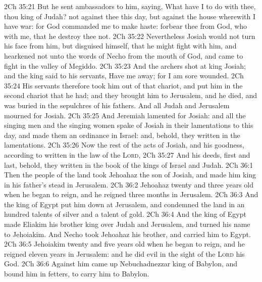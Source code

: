 \vs 2Ch 35:21 But he sent ambassadors to him, saying, What have I to do with thee, thou king of Judah?  not against thee this day, but against the house wherewith I have war: for God commanded me to make haste: forbear thee from  God, who  with me, that he destroy thee not.
\vs 2Ch 35:22 Nevertheless Josiah would not turn his face from him, but disguised himself, that he might fight with him, and hearkened not unto the words of Necho from the mouth of God, and came to fight in the valley of Megiddo.
\vs 2Ch 35:23 And the archers shot at king Josiah; and the king said to his servants, Have me away; for I am sore wounded.
\vs 2Ch 35:24 His servants therefore took him out of that chariot, and put him in the second chariot that he had; and they brought him to Jerusalem, and he died, and was buried in  the sepulchres of his fathers. And all Judah and Jerusalem mourned for Josiah.
\vs 2Ch 35:25 And Jeremiah lamented for Josiah: and all the singing men and the singing women spake of Josiah in their lamentations to this day, and made them an ordinance in Israel: and, behold, they  written in the lamentations.
\vs 2Ch 35:26 Now the rest of the acts of Josiah, and his goodness, according to  written in the law of the \textsc{Lord},
\vs 2Ch 35:27 And his deeds, first and last, behold, they  written in the book of the kings of Israel and Judah.
\vs 2Ch 36:1 Then the people of the land took Jehoahaz the son of Josiah, and made him king in his father's stead in Jerusalem.
\vs 2Ch 36:2 Jehoahaz  twenty and three years old when he began to reign, and he reigned three months in Jerusalem.
\vs 2Ch 36:3 And the king of Egypt put him down at Jerusalem, and condemned the land in an hundred talents of silver and a talent of gold.
\vs 2Ch 36:4 And the king of Egypt made Eliakim his brother king over Judah and Jerusalem, and turned his name to Jehoiakim. And Necho took Jehoahaz his brother, and carried him to Egypt.
\vs 2Ch 36:5 Jehoiakim  twenty and five years old when he began to reign, and he reigned eleven years in Jerusalem: and he did  evil in the sight of the \textsc{Lord} his God.
\vs 2Ch 36:6 Against him came up Nebuchadnezzar king of Babylon, and bound him in fetters, to carry him to Babylon.
